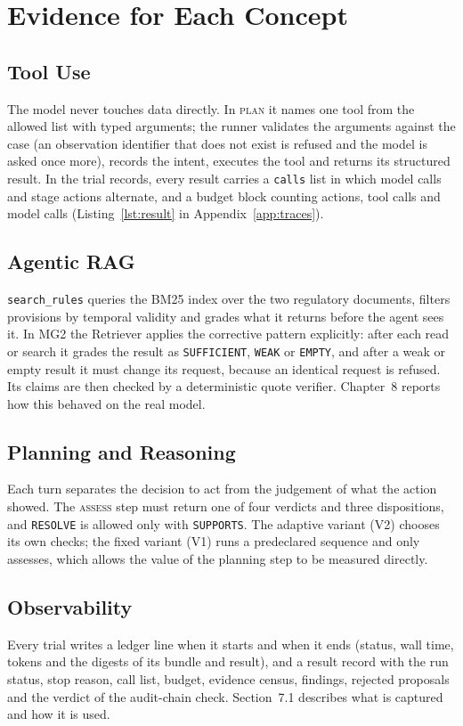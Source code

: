 \section{Evidence for Each Concept}

\subsection{Tool Use}
The model never touches data directly. In \textsc{plan} it names one tool from the allowed list with
typed arguments; the runner validates the arguments against the case (an observation identifier
that does not exist is refused and the model is asked once more), records the intent, executes the
tool and returns its structured result. In the trial records, every result carries a
\texttt{calls} list in which model calls and stage actions alternate, and a budget block counting
actions, tool calls and model calls (Listing~\ref{lst:result} in Appendix~\ref{app:traces}).

\subsection{Agentic RAG}
\texttt{search\_rules} queries the BM25 index over the two regulatory documents, filters
provisions by temporal validity and grades what it returns before the agent sees it. In MG2 the
Retriever applies the corrective pattern explicitly: after each read or search it grades the result
as \texttt{SUFFICIENT}, \texttt{WEAK} or \texttt{EMPTY}, and after a weak or empty result it must
change its request, because an identical request is refused. Its claims are then checked by a
deterministic quote verifier. Chapter~8 reports how this behaved on the real model.

\subsection{Planning and Reasoning}
Each turn separates the decision to act from the judgement of what the action showed. The
\textsc{assess} step must return one of four verdicts and three dispositions, and \texttt{RESOLVE}
is allowed only with \texttt{SUPPORTS}. The adaptive variant (V2) chooses its own checks; the fixed
variant (V1) runs a predeclared sequence and only assesses, which allows the value of the planning
step to be measured directly.

\subsection{Observability}
Every trial writes a ledger line when it starts and when it ends (status, wall time, tokens and the
digests of its bundle and result), and a result record with the run status, stop reason, call list,
budget, evidence census, findings, rejected proposals and the verdict of the audit-chain check.
Section~7.1 describes what is captured and how it is used.

